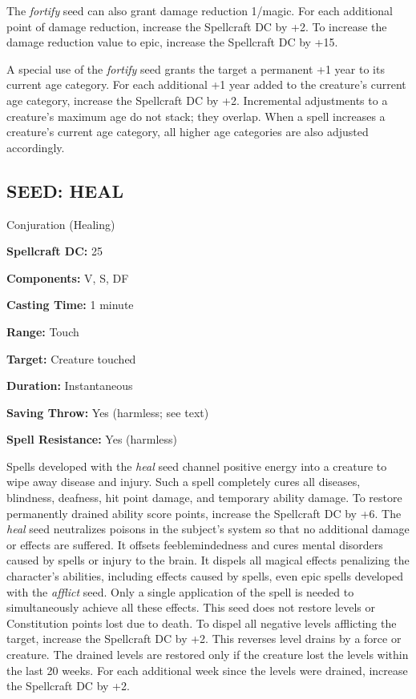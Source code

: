 \documentclass{article}
\begin{document}
The \textit{fortify }seed can also grant damage reduction 1/magic. For each additional 
point of damage reduction, increase the Spellcraft DC by +2. To increase the damage 
reduction value to epic, increase the Spellcraft DC by +15.

A special use of the \textit{fortify }seed grants the target a permanent +1 year 
to its current age category. For each additional +1 year added to the creature's 
current age category, increase the Spellcraft DC by +2. Incremental adjustments 
to a creature's maximum age do not stack; they overlap. When a spell increases 
a creature's current age category, all higher age categories are also adjusted 
accordingly.

\vspace{12pt}
\subsection*{SEED: HEAL }

Conjuration (Healing) 

\textbf{Spellcraft DC:} 25 

\textbf{Components:} V, S, DF 

\textbf{Casting Time:} 1 minute 

\textbf{Range:} Touch 

\textbf{Target:} Creature touched 

\textbf{Duration:} Instantaneous 

\textbf{Saving Throw:} Yes (harmless; see text) 

\textbf{Spell Resistance:} Yes (harmless) 

Spells developed with the \textit{heal }seed channel positive energy into a creature 
to wipe away disease and injury. Such a spell completely cures all diseases, blindness, 
deafness, hit point damage, and temporary ability damage. To restore permanently 
drained ability score points, increase the Spellcraft DC by +6. The \textit{heal 
}seed neutralizes poisons in the subject's system so that no additional damage 
or effects are suffered. It offsets feeblemindedness and cures mental disorders 
caused by spells or injury to the brain. It dispels all magical effects penalizing 
the character's abilities, including effects caused by spells, even epic spells 
developed with the \textit{afflict }seed. Only a single application of the spell 
is needed to simultaneously achieve all these effects. This seed does not restore 
levels or Constitution points lost due to death. To dispel all negative levels 
afflicting the target, increase the Spellcraft DC by +2. This reverses level drains 
by a force or creature. The drained levels are restored only if the creature lost 
the levels within the last 20 weeks. For each additional week since the levels 
were drained, increase the Spellcraft DC by +2. 
\end{document}
